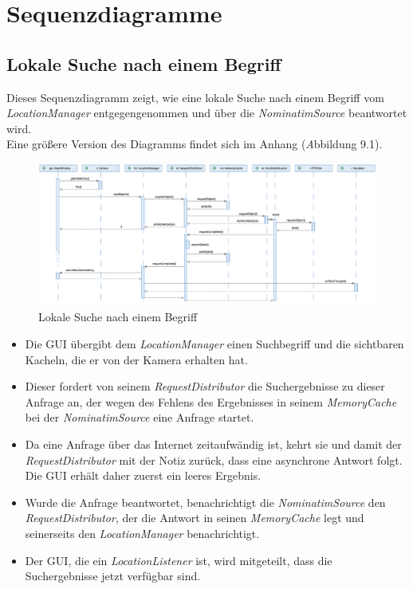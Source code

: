 \documentclass[10pt]{scrreprt}
\newcommand{\textref}[1]{\mbox{\raisebox{0.1ex}{\small$\rightarrow$ }\textit{#1}}}
\begin{document}
\chapter{Sequenzdiagramme}

\section{Lokale Suche nach einem Begriff}
Dieses Sequenzdiagramm zeigt, wie eine lokale Suche nach einem Begriff vom \textit{LocationManager} entgegengenommen und über die \textit{NominatimSource} beantwortet wird.\\[3mm]
Eine größere Version des Diagramms findet sich im Anhang (\textref Abbildung 9.1).

\vspace*{5mm}
\begin{figure}[h]
\begin{center}
\includegraphics[scale=0.28]{sequenz-search.eps}
\caption{Lokale Suche nach einem Begriff}
\end{center}
\end{figure}

\begin{itemize}
\item Die GUI übergibt dem \textit{LocationManager} einen Suchbegriff und die sichtbaren Kacheln, die er von der Kamera erhalten hat.
\item Dieser fordert von seinem \textit{RequestDistributor} die Suchergebnisse zu dieser Anfrage an, der wegen des Fehlens des Ergebnisses in seinem \textit{MemoryCache} bei der \textit{NominatimSource} eine Anfrage startet. 
\item Da eine Anfrage über das Internet zeitaufwändig ist, kehrt sie und damit der \textit{RequestDistributor} mit der Notiz zurück, dass eine asynchrone Antwort folgt. Die GUI erhält daher zuerst ein leeres Ergebnis.
\item Wurde die Anfrage beantwortet, benachrichtigt die \textit{NominatimSource} den \textit{RequestDistributor}, der die Antwort in seinen \textit{MemoryCache} legt und seinerseits den \textit{LocationManager} benachrichtigt.
\item Der GUI, die ein \textit{LocationListener} ist, wird mitgeteilt, dass die Suchergebnisse jetzt verfügbar sind.
\end{itemize}
\newpage
\end{document}
